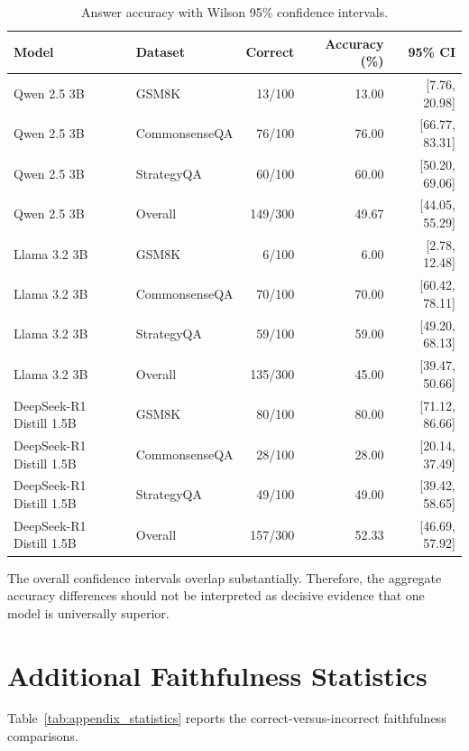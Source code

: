 \documentclass{article}
\begin{document}
\begin{table}[t]
\centering
\small
\caption{Answer accuracy with Wilson 95\% confidence intervals.}
\label{tab:appendix_accuracy}
\begin{tabular}{llrrr}
\toprule
\textbf{Model} &
\textbf{Dataset} &
\textbf{Correct} &
\textbf{Accuracy (\%)} &
\textbf{95\% CI} \\
\midrule
Qwen 2.5 3B & GSM8K & 13/100 & 13.00 & [7.76, 20.98] \\
Qwen 2.5 3B & CommonsenseQA & 76/100 & 76.00 & [66.77, 83.31] \\
Qwen 2.5 3B & StrategyQA & 60/100 & 60.00 & [50.20, 69.06] \\
Qwen 2.5 3B & Overall & 149/300 & 49.67 & [44.05, 55.29] \\
\midrule
Llama 3.2 3B & GSM8K & 6/100 & 6.00 & [2.78, 12.48] \\
Llama 3.2 3B & CommonsenseQA & 70/100 & 70.00 & [60.42, 78.11] \\
Llama 3.2 3B & StrategyQA & 59/100 & 59.00 & [49.20, 68.13] \\
Llama 3.2 3B & Overall & 135/300 & 45.00 & [39.47, 50.66] \\
\midrule
DeepSeek-R1 Distill 1.5B & GSM8K & 80/100 & 80.00 & [71.12, 86.66] \\
DeepSeek-R1 Distill 1.5B & CommonsenseQA & 28/100 & 28.00 & [20.14, 37.49] \\
DeepSeek-R1 Distill 1.5B & StrategyQA & 49/100 & 49.00 & [39.42, 58.65] \\
DeepSeek-R1 Distill 1.5B & Overall & 157/300 & 52.33 & [46.69, 57.92] \\
\bottomrule
\end{tabular}
\end{table}

The overall confidence intervals overlap substantially. Therefore, the
aggregate accuracy differences should not be interpreted as decisive
evidence that one model is universally superior.

\section{Additional Faithfulness Statistics}
\label{app:statistics}

Table~\ref{tab:appendix_statistics} reports the correct-versus-incorrect
faithfulness comparisons.
\end{document}

